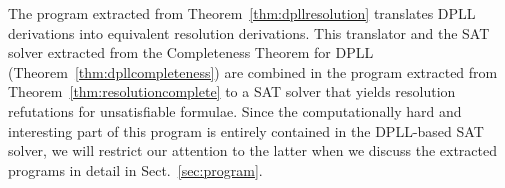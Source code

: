 The program extracted from Theorem~\ref{thm:dpllresolution} translates 
DPLL derivations into equivalent resolution derivations.
This translator and the SAT solver extracted from the Completeness Theorem for 
DPLL (Theorem~\ref{thm:dpllcompleteness}) are combined in the
program extracted from Theorem~\ref{thm:resolutioncomplete}
to a SAT solver that yields resolution refutations for unsatisfiable formulae.
Since the computationally hard and interesting part of this program is 
entirely contained in the DPLL-based SAT solver, we will restrict
our attention to the latter when we discuss the extracted programs in detail 
in Sect.~\ref{sec:program}.





